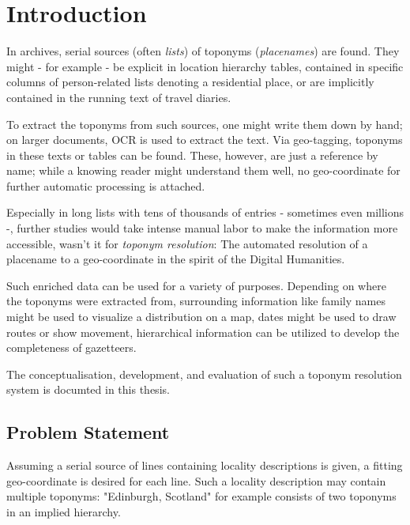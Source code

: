 \documentclass[11pt]{article}
\begin{document}
\newpage
\tableofcontents 
\newpage


\section{Introduction}

In archives, serial sources (often \emph{lists}) of toponyms (\emph{placenames}) are found. They might - for example - be explicit in location hierarchy tables, contained in specific columns of person-related lists denoting a residential place, or are implicitly contained in the running text of travel diaries.

To extract the toponyms from such sources, one might write them down by hand; on larger documents, OCR is used to extract the text. Via geo-tagging, toponyms in these texts or tables can be found. These, however, are just a reference by name; while a knowing reader might understand them well, no geo-coordinate for further automatic processing is attached.

Especially in long lists with tens of thousands of entries - sometimes even millions -, further studies would take intense manual labor to make the information more accessible, wasn't it for \emph{toponym resolution}: The automated resolution of a placename to a geo-coordinate in the spirit of the Digital Humanities.

Such enriched data can be used for a variety of purposes. Depending on where the toponyms were extracted from, surrounding information like family names might be used to visualize a distribution on a map, dates might be used to draw routes or show movement, hierarchical information can be utilized to develop the completeness of gazetteers.

The conceptualisation, development, and evaluation of such a toponym resolution system is documted in this thesis.

\subsection{Problem Statement}

Assuming a serial source of lines containing locality descriptions is given, a fitting geo-coordinate is desired for each line. Such a locality description may contain multiple toponyms: "Edinburgh, Scotland" for example consists of two toponyms in an implied hierarchy.
\end{document}
